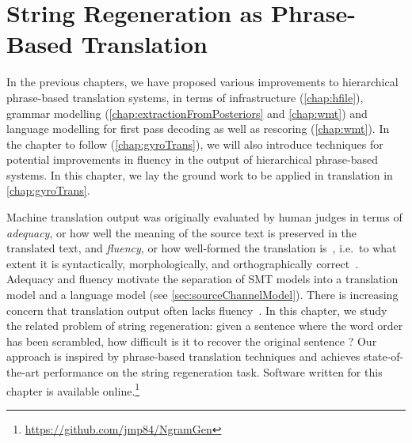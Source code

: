 \chapter{String Regeneration as Phrase-Based Translation}
\label{chap:gyro}


In the previous chapters, we have proposed various improvements to hierarchical
phrase-based translation systems, in terms of
infrastructure (\autoref{chap:hfile}), grammar
modelling (\autoref{chap:extractionFromPosteriors} and \autoref{chap:wmt})
and language modelling for first pass decoding as well as
rescoring (\autoref{chap:wmt}). In the
chapter to follow (\autoref{chap:gyroTrans}), we will also
introduce techniques for potential improvements in fluency in the output
of hierarchical phrase-based systems. In this chapter, we lay
the ground work to be applied in translation in \autoref{chap:gyroTrans}.

Machine translation output was originally evaluated by
human judges in terms
of \emph{adequacy}, or how well the meaning of the source
text is preserved in the translated text, and \emph{fluency},
or how well-formed the translation is~\citep{white-oconnell-carlson:1993:HLT},
i.e.\ to what extent it is syntactically, morphologically, and orthographically
correct~\citep{reiter-dale:1997:JNLE}.
Adequacy and fluency motivate the
separation of SMT models
into a translation model and a language model (see \autoref{sec:sourceChannelModel}).
There is increasing concern that translation output
often lacks fluency~\citep{knight:2007:TALK}.
In this chapter, we study the related problem of
string regeneration: given a sentence where the
word order has been scrambled, how difficult is it
to recover the original sentence ? Our approach
is inspired by phrase-based translation techniques and
achieves state-of-the-art performance on the string regeneration
task. Software written for this chapter is available
online.\footnote{\url{https://github.com/jmp84/NgramGen}}

